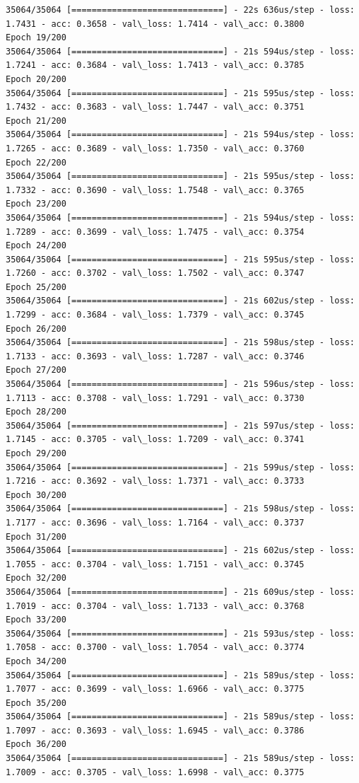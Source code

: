 \documentclass[11pt]{article}
\begin{document}
\begin{Verbatim}[commandchars=\\\{\}]
35064/35064 [==============================] - 22s 636us/step - loss: 1.7431 - acc: 0.3658 - val\_loss: 1.7414 - val\_acc: 0.3800
Epoch 19/200
35064/35064 [==============================] - 21s 594us/step - loss: 1.7241 - acc: 0.3684 - val\_loss: 1.7413 - val\_acc: 0.3785
Epoch 20/200
35064/35064 [==============================] - 21s 595us/step - loss: 1.7432 - acc: 0.3683 - val\_loss: 1.7447 - val\_acc: 0.3751
Epoch 21/200
35064/35064 [==============================] - 21s 594us/step - loss: 1.7265 - acc: 0.3689 - val\_loss: 1.7350 - val\_acc: 0.3760
Epoch 22/200
35064/35064 [==============================] - 21s 595us/step - loss: 1.7332 - acc: 0.3690 - val\_loss: 1.7548 - val\_acc: 0.3765
Epoch 23/200
35064/35064 [==============================] - 21s 594us/step - loss: 1.7289 - acc: 0.3699 - val\_loss: 1.7475 - val\_acc: 0.3754
Epoch 24/200
35064/35064 [==============================] - 21s 595us/step - loss: 1.7260 - acc: 0.3702 - val\_loss: 1.7502 - val\_acc: 0.3747
Epoch 25/200
35064/35064 [==============================] - 21s 602us/step - loss: 1.7299 - acc: 0.3684 - val\_loss: 1.7379 - val\_acc: 0.3745
Epoch 26/200
35064/35064 [==============================] - 21s 598us/step - loss: 1.7133 - acc: 0.3693 - val\_loss: 1.7287 - val\_acc: 0.3746
Epoch 27/200
35064/35064 [==============================] - 21s 596us/step - loss: 1.7113 - acc: 0.3708 - val\_loss: 1.7291 - val\_acc: 0.3730
Epoch 28/200
35064/35064 [==============================] - 21s 597us/step - loss: 1.7145 - acc: 0.3705 - val\_loss: 1.7209 - val\_acc: 0.3741
Epoch 29/200
35064/35064 [==============================] - 21s 599us/step - loss: 1.7216 - acc: 0.3692 - val\_loss: 1.7371 - val\_acc: 0.3733
Epoch 30/200
35064/35064 [==============================] - 21s 598us/step - loss: 1.7177 - acc: 0.3696 - val\_loss: 1.7164 - val\_acc: 0.3737
Epoch 31/200
35064/35064 [==============================] - 21s 602us/step - loss: 1.7055 - acc: 0.3704 - val\_loss: 1.7151 - val\_acc: 0.3745
Epoch 32/200
35064/35064 [==============================] - 21s 609us/step - loss: 1.7019 - acc: 0.3704 - val\_loss: 1.7133 - val\_acc: 0.3768
Epoch 33/200
35064/35064 [==============================] - 21s 593us/step - loss: 1.7058 - acc: 0.3700 - val\_loss: 1.7054 - val\_acc: 0.3774
Epoch 34/200
35064/35064 [==============================] - 21s 589us/step - loss: 1.7077 - acc: 0.3699 - val\_loss: 1.6966 - val\_acc: 0.3775
Epoch 35/200
35064/35064 [==============================] - 21s 589us/step - loss: 1.7097 - acc: 0.3693 - val\_loss: 1.6945 - val\_acc: 0.3786
Epoch 36/200
35064/35064 [==============================] - 21s 589us/step - loss: 1.7009 - acc: 0.3705 - val\_loss: 1.6998 - val\_acc: 0.3775

\end{Verbatim}
\end{document}
